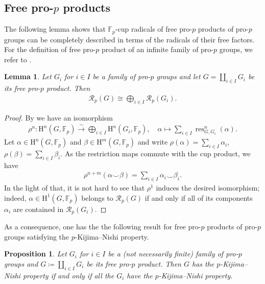 \documentclass{amsart}
\newtheorem{prop}[thm]{Proposition}
\newtheorem{lem}[thm]{Lemma}
\theoremstyle{definition}
\theoremstyle{remark}
\DeclareMathOperator{\res}{res}
\newcommand{\FF}{\mathbb{F}}
\newcommand{\calR}{\mathcal{R}}
\newcommand{\rmH}{\mathrm H}%
\newcommand{\F}{\FF}
\begin{document}


\subsection{Free pro-\texorpdfstring{$p$}{} products}
\label{ssec:Free pro-p and free products}


The following lemma shows that $\FF_p$-cup radicals of free pro-$p$ products of pro-$p$ groups can be completely described in terms of the radicals of their free factors. For the definition of free pro-$p$ product of an infinite family of pro-$p$ groups, we refer to \cite[Ch.~IV, \S~1]{NSW2008}.

\begin{lem}\label{lem:freeprod}
    Let $G_i$ for $i\in I$ be a family of pro-$p$ groups and let $G=\coprod_{i\in I}G_i$ be its free pro-$p$ product. Then
    \begin{align*}
        \calR_p(G)\cong \bigoplus_{i\in I}\calR_p(G_i).
    \end{align*}
\end{lem}

\begin{proof}
    By \cite[Thm.~4.1.4]{NSW2008} we have an isomorphism
    \begin{align*}
        \rho^n:\rmH^n(G,\F_p)\overset{\sim}\longrightarrow\bigoplus_{i\in I}\rmH^n(G_i,\F_p),\quad \alpha\longmapsto \sum_{i\in I}\res_{G,G_i}^n(\alpha).
    \end{align*}
    Let $\alpha\in \rmH^n(G,\F_p)$ and $\beta\in \rmH^m(G,\F_p)$ and write $\rho(\alpha)=\sum_{i\in I}\alpha_i$, $\rho(\beta)=\sum_{i\in I}\beta_i$. As the restriction maps commute with the cup product, we have
    \begin{align*}
        \rho^{n+m}(\alpha \smallsmile \beta)=\sum_{i\in I}\alpha_i\smallsmile \beta_i.
    \end{align*}
    In the light of that, it is not hard to see that $\rho^1$ induces the desired isomorphism; indeed, $\alpha\in \rmH^1(G,\FF_p)$ belongs to $\calR_p(G)$ if and only if all of its components $\alpha_i$ are contained in $\calR_p(G_i)$.
\end{proof}
As a consequence, one has the the following result for free pro-$p$ products of pro-$p$ groups satisfying the $p$-Kijima--Nishi property.

\begin{prop}\label{prop:KNFreeProduct}
    Let $G_i$ for $i\in I$ be a (not necessarily finite) family of pro-$p$ groups and $G\coloneq \coprod_{i\in I}G_i$ be its free pro-$p$ product. Then $G$ has the $p$-Kijima--Nishi property if and only if all the $G_i$ have the $p$-Kijima--Nishi property.
\end{prop}
\end{document}
